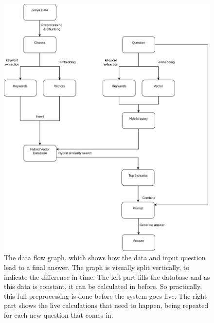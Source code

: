 \begin{figure}[H]
    \captionsetup{justification=centering}
    \centerline{\includegraphics[width=1\linewidth]{fig/dataflow_graph.png}}
    \caption{The data flow graph, which shows how the data and input question lead to a final answer. The graph is visually split vertically, to indicate the difference in time. The left part fills the database and as this data is constant, it can be calculated in before. So practically, this full preprocessing is done before the system goes live. The right part shows the live calculations that need to happen, being repeated for each new question that comes in.}
    \label{fig:dataflow_graph}
\end{figure}

